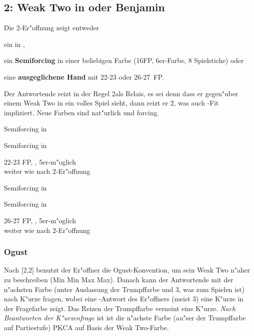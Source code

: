 \subsection{2\tre: Weak Two in \ka oder Benjamin}

Die 2\tre-Er"offnung zeigt entweder
\begin{compactitem}
\item ein  in \ka,
\item ein \textbf{Semiforcing} in einer beliebigen Farbe
  (16\pl FP, 6\pl{}er-Farbe, 8 Spielstiche) oder
\item eine \textbf{ausgeglichene Hand} mit 22-23 oder 26-27~FP.
\end{compactitem}
Der Antwortende reizt in der Regel 2\kar als Relais, es sei denn dass
er gegen"uber einem Weak Two in \ka ein volles Spiel sieht, dann reizt
er 2\SA, was auch \ka-Fit impliziert. Neue Farben sind nat"urlich und forcing.

\bdsc
\item[2\tre{}\sep2\kar;] \rel
  \bdsc
  \item[2\coe] Semiforcing in \co
  \item[2\pik] Semiforcing in \pi
  \item[2\SA] 22-23 FP, \bal, 5er-\ofa m"oglich \\
    \ra weiter wie nach 2\SA-Er"offnung
  \item[3\tre] Semiforcing in \tr
  \item[3\kar] Semiforcing in \ka
  \item[3\SA] 26-27 FP, \bal, 5er-\ofa m"oglich \\
    \ra weiter wie nach 2\SA-Er"offnung
  \edsc
\edsc

\subsubsection{Ogust} \label{ogust}

Nach [2\tre{}\sep2\SA{}] benutzt der Er"offner die Ogust-Konvention, um sein Weak
Two n"aher zu beschreiben (Min Min Max Max). Danach kann der Antwortende mit der n"achsten Farbe
(unter Auslassung der Trumpffarbe und 3\SA, was zum Spielen ist) nach K"urze fragen, wobei eine \sa-Antwort des
Er"offners (meist 3\SA) eine K"urze in der Fragefarbe zeigt. Das Reizen der
Trumpffarbe verneint eine K"urze. \emph{Nach Beantworten der K"urzenfrage} ist
ist die n"achste Farbe (au"ser der Trumpffarbe auf Partiestufe) PKCA auf Basis
der Weak Two-Farbe.

